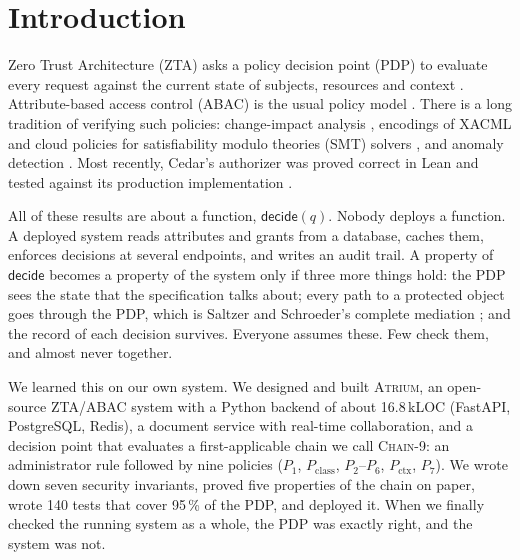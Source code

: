 \documentclass[sigconf,review,anonymous]{acmart}
\newcommand{\sysname}{\textsc{Atrium}\xspace}
\newcommand{\sysname}{\textsc{OpenZTAC}\xspace}
\newcommand{\chain}{\textsc{Chain-9}\xspace}
\newcommand{\Pc}{P_{\mathrm{class}}}
\newcommand{\Px}{P_{\mathrm{ctx}}}
\newcommand{\decide}{\mathsf{decide}}
\begin{document}


\maketitle

\section{Introduction}

Zero Trust Architecture (ZTA) asks a policy decision point (PDP) to evaluate every request against the
current state of subjects, resources and context \cite{rose2020zta,chandramouli2023sp800207a,kerman2025sp180035}.
Attribute-based access control (ABAC) is the usual policy model \cite{hu2014sp800162,jin2012abac}. There is a
long tradition of verifying such policies: change-impact analysis \cite{fisler2005margrave}, encodings of XACML
and cloud policies for satisfiability modulo theories (SMT) solvers \cite{turkmen2017xacmlsmt,backes2018zelkova},
and anomaly detection \cite{hu2011anomaly}. Most recently, Cedar's authorizer was proved correct in Lean and
tested against its production implementation \cite{cutler2024cedar,disselkoen2024vgd}.

All of these results are about a function, $\decide(q)$. Nobody deploys a function. A deployed system reads
attributes and grants from a database, caches them, enforces decisions at several endpoints, and writes an
audit trail. A property of $\decide$ becomes a property of the system only if three more things hold: the
PDP sees the state that the specification talks about; every path to a protected object goes through the PDP,
which is Saltzer and Schroeder's complete mediation \cite{saltzer1975protection}; and the record of each
decision survives. Everyone assumes these. Few check them, and almost never together.

We learned this on our own system. We designed and built \sysname, an open-source ZTA/ABAC system with a
Python backend of about 16.8\,kLOC (FastAPI, PostgreSQL, Redis), a document service with real-time
collaboration, and a decision point that evaluates a first-applicable chain we call \chain: an administrator rule followed by nine
policies ($P_1$, $\Pc$, $P_2$--$P_6$, $\Px$, $P_7$). We
wrote down seven security invariants, proved five properties of the chain on paper, wrote 140 tests that
cover 95\,\% of the PDP, and deployed it. When we finally checked the running system as a whole, the PDP was
exactly right, and the system was not.
\end{document}
